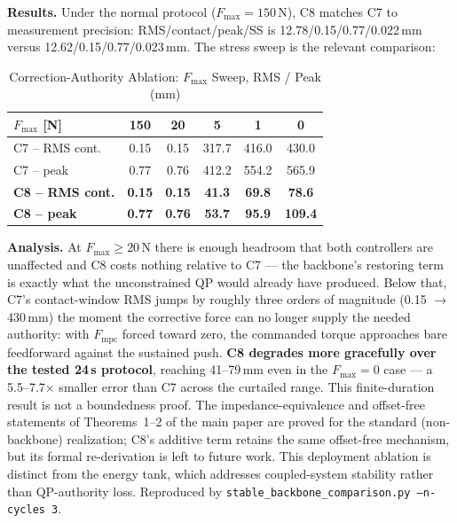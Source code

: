 \documentclass[journal]{IEEEtran}
\newcommand{\Fmpc}{F_{\text{mpc}}}
\begin{document}
\textbf{Results.} Under the normal protocol ($F_\text{max}=150$\,N), C8
matches C7 to measurement precision: RMS/contact/peak/SS is
12.78/0.15/0.77/0.022\,mm versus 12.62/0.15/0.77/0.023\,mm. The stress sweep
is the relevant comparison:

\begin{table}[!t]
\caption{Correction-Authority Ablation: $F_\text{max}$ Sweep, RMS /
Peak (mm)}
\label{tab:backbone}
\renewcommand{\arraystretch}{1.0}
\footnotesize
\setlength{\tabcolsep}{3pt}
\begin{tabular}{lccccc}
\toprule
$F_\text{max}$ [N] & 150 & 20 & 5 & 1 & 0\\
\midrule
C7 -- RMS cont. & 0.15 & 0.15 & 317.7 & 416.0 & 430.0\\
C7 -- peak      & 0.77 & 0.76 & 412.2 & 554.2 & 565.9\\
\textbf{C8 -- RMS cont.} & \textbf{0.15} & \textbf{0.15} & \textbf{41.3} & \textbf{69.8} & \textbf{78.6}\\
\textbf{C8 -- peak}      & \textbf{0.77} & \textbf{0.76} & \textbf{53.7} & \textbf{95.9} & \textbf{109.4}\\
\bottomrule
\end{tabular}
\end{table}

\textbf{Analysis.} At $F_\text{max}\ge20$\,N there is enough headroom
that both controllers are unaffected and C8 costs nothing relative to
C7 --- the backbone's restoring term is exactly what the unconstrained
QP would already have produced. Below that, C7's contact-window RMS
jumps by roughly three orders of magnitude (0.15 $\to$ 430\,mm) the
moment the corrective force can no longer supply the needed authority:
with $\Fmpc$ forced toward zero, the commanded torque approaches bare
feedforward against the sustained push. \textbf{C8 degrades more gracefully
over the tested 24\,s protocol}, reaching 41--79\,mm even in the
$F_\text{max}=0$ case --- a 5.5--7.7$\times$ smaller error than C7 across the
curtailed range. This finite-duration result is not a boundedness proof. The impedance-equivalence and offset-free
statements of Theorems~1--2 of the main paper are proved for the standard
(non-backbone) realization; C8's additive term retains the same
offset-free mechanism, but its formal re-derivation is left to future work.
This deployment ablation is distinct from the energy tank, which addresses
coupled-system stability rather than QP-authority loss. Reproduced by
\texttt{stable\_backbone\_comparison.py --n-cycles 3}.
\end{document}
